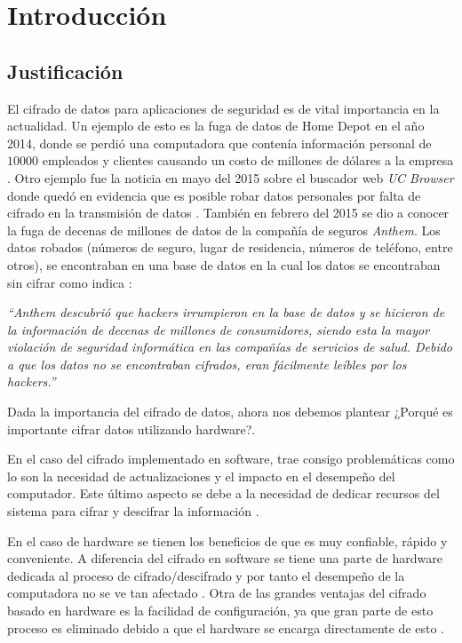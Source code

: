 \chapter{Introducción}
\section{Justificación}
El cifrado de datos para aplicaciones de seguridad es de vital importancia en la actualidad. Un ejemplo de esto es la fuga de datos de Home Depot en el año 2014, donde se perdió una computadora que contenía información personal de $10000$ empleados y clientes causando un costo de millones de dólares a la empresa \citep{homeDepot}. Otro ejemplo fue la noticia en mayo del 2015 sobre el buscador web \textit{UC Browser} donde quedó en evidencia que es posible robar datos personales por falta de cifrado en la transmisión de datos \citep{ucBrowser}. También en febrero del 2015 se dio a conocer la fuga de decenas de millones de datos de la compañía de seguros \textit{Anthem}. Los datos robados (números de seguro, lugar de residencia, números de teléfono, entre otros), se encontraban en una base de datos en la cual los datos se encontraban sin cifrar como indica \cite{anthem}:
\begin{center}
    \begin{minipage}{0.9\linewidth}
        \vspace{5pt}%
        {\small
            \emph{``\textit{Anthem} descubrió que \textit{hackers} irrumpieron en la base de datos y se hicieron de la información de decenas de millones de consumidores, siendo esta la mayor violación de seguridad informática en las compañías de servicios de salud. Debido a que los datos no se encontraban cifrados, eran fácilmente leíbles por los \textit{hackers}.''}
        }
 		\vspace{5pt}%
    \end{minipage}
\end{center}
Dada la importancia del cifrado de datos, ahora nos debemos plantear ¿Porqué es importante cifrar datos utilizando hardware?.

En el caso del cifrado implementado en software, trae consigo problemáticas como lo son la necesidad de actualizaciones y el impacto en el desempeño del computador. Este último aspecto se debe a la necesidad de dedicar recursos del sistema para cifrar y descifrar la información \citep{apricorn}.

En el caso de hardware se tienen los beneficios de que es muy confiable, rápido y conveniente. A diferencia del cifrado en software se tiene una parte de hardware dedicada al proceso de cifrado/descifrado y por tanto el desempeño de la computadora no se ve tan afectado \citep{apricorn}. Otra de las grandes ventajas del cifrado basado en hardware es la facilidad de configuración, ya que gran parte de esto proceso es eliminado debido a que el hardware se encarga directamente de esto \citep{driveTrust}.

